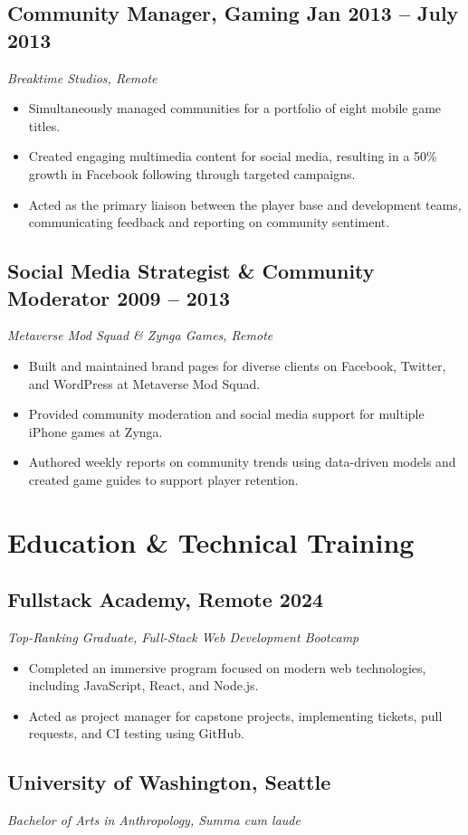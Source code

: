 \documentclass[a4paper,12pt]{article} %
\begin{document}
\subsection{Community Manager, Gaming \hfill Jan 2013 – July 2013}
\textit{Breaktime Studios, Remote}
\begin{itemize}
    \item Simultaneously managed communities for a portfolio of eight mobile game titles.
    \item Created engaging multimedia content for social media, resulting in a 50\% growth in Facebook following through targeted campaigns.
    \item Acted as the primary liaison between the player base and development teams, communicating feedback and reporting on community sentiment.
\end{itemize}

\subsection{Social Media Strategist \& Community Moderator \hfill 2009 – 2013}
\textit{Metaverse Mod Squad \& Zynga Games, Remote}
\begin{itemize}
    \item Built and maintained brand pages for diverse clients on Facebook, Twitter, and WordPress at Metaverse Mod Squad.
    \item Provided community moderation and social media support for multiple iPhone games at Zynga.
    \item Authored weekly reports on community trends using data-driven models and created game guides to support player retention.
\end{itemize}

\section{Education \& Technical Training}
\subsection{Fullstack Academy, Remote \hfill 2024}
\textit{Top-Ranking Graduate, Full-Stack Web Development Bootcamp}
\begin{itemize}
    \item Completed an immersive program focused on modern web technologies, including JavaScript, React, and Node.js.
    \item Acted as project manager for capstone projects, implementing tickets, pull requests, and CI testing using GitHub.
\end{itemize}

\subsection{University of Washington, Seattle \hfill}
\textit{Bachelor of Arts in Anthropology, Summa cum laude}
\end{document}
